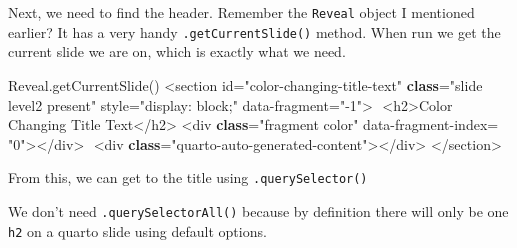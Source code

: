 \documentclass[
  letterpaper,
  DIV=11,
  numbers=noendperiod]{scrreprt}
\newenvironment{Shaded}{\begin{snugshade}}{\end{snugshade}}
\newcommand{\FunctionTok}[1]{\textcolor[rgb]{0.28,0.35,0.67}{#1}}
\newcommand{\KeywordTok}[1]{\textcolor[rgb]{0.00,0.23,0.31}{\textbf{#1}}}
\newcommand{\NormalTok}[1]{\textcolor[rgb]{0.00,0.23,0.31}{#1}}
\newcommand{\OperatorTok}[1]{\textcolor[rgb]{0.37,0.37,0.37}{#1}}
\newcommand{\StringTok}[1]{\textcolor[rgb]{0.13,0.47,0.30}{#1}}
\begin{document}
Next, we need to find the header. Remember the \texttt{Reveal} object I
mentioned earlier? It has a very handy \texttt{.getCurrentSlide()}
method. When run we get the current slide we are on, which is exactly
what we need.

\begin{Shaded}
\begin{Highlighting}[]
\NormalTok{Reveal}\OperatorTok{.}\FunctionTok{getCurrentSlide}\NormalTok{()}
\OperatorTok{\textless{}}\NormalTok{section id}\OperatorTok{=}\NormalTok{​}\StringTok{"color{-}changing{-}title{-}text"} \KeywordTok{class}\OperatorTok{=}\NormalTok{​}\StringTok{"slide level2 present"}\NormalTok{ style}\OperatorTok{=}\NormalTok{​}\StringTok{"display:​ block;​"}\NormalTok{ data}\OperatorTok{{-}}\NormalTok{fragment}\OperatorTok{=}\NormalTok{​}\StringTok{"{-}1"}\OperatorTok{\textgreater{}}
\NormalTok{​  }\OperatorTok{\textless{}}\NormalTok{h2}\OperatorTok{\textgreater{}}\NormalTok{​Color Changing Title Text​}\OperatorTok{\textless{}/}\NormalTok{h2}\OperatorTok{\textgreater{}}
\NormalTok{  ​}\OperatorTok{\textless{}}\NormalTok{div }\KeywordTok{class}\OperatorTok{=}\NormalTok{​}\StringTok{"fragment color"}\NormalTok{ data}\OperatorTok{{-}}\NormalTok{fragment}\OperatorTok{{-}}\NormalTok{index}\OperatorTok{=}\NormalTok{​}\StringTok{"0"}\OperatorTok{\textgreater{}}\NormalTok{​}\OperatorTok{\textless{}/}\NormalTok{div}\OperatorTok{\textgreater{}}
\NormalTok{​  }\OperatorTok{\textless{}}\NormalTok{div }\KeywordTok{class}\OperatorTok{=}\NormalTok{​}\StringTok{"quarto{-}auto{-}generated{-}content"}\OperatorTok{\textgreater{}}\NormalTok{​}\OperatorTok{\textless{}/}\NormalTok{div}\OperatorTok{\textgreater{}}\NormalTok{​}
\OperatorTok{\textless{}/}\NormalTok{section}\OperatorTok{\textgreater{}}\NormalTok{​}
\end{Highlighting}
\end{Shaded}

From this, we can get to the title using \texttt{.querySelector()}

\begin{tcolorbox}[enhanced jigsaw, titlerule=0mm, bottomrule=.15mm, opacityback=0, colbacktitle=quarto-callout-note-color!10!white, colframe=quarto-callout-note-color-frame, coltitle=black, breakable, toprule=.15mm, colback=white, bottomtitle=1mm, title=\textcolor{quarto-callout-note-color}{\faInfo}\hspace{0.5em}{Note}, toptitle=1mm, arc=.35mm, left=2mm, leftrule=.75mm, rightrule=.15mm, opacitybacktitle=0.6]

We don't need \texttt{.querySelectorAll()} because by definition there
will only be one \texttt{h2} on a quarto slide using default options.

\end{tcolorbox}
\end{document}
